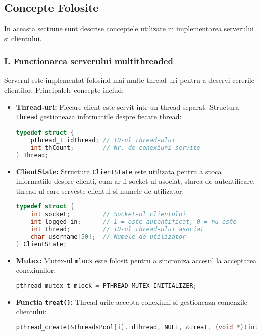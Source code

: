 \documentclass[runningheads]{llncs}
\begin{document}
\subsection{Concepte Folosite}
In aceasta sectiune sunt descrise conceptele utilizate in implementarea serverului si clientului.

\subsubsection*{I. Functionarea serverului multithreaded}
Serverul este implementat folosind mai multe thread-uri pentru a deservi cererile clientilor. Principalele concepte includ:
\begin{itemize}
    \item \textbf{Thread-uri:} Fiecare client este servit intr-un thread separat. Structura \texttt{Thread} gestioneaza informatiile despre fiecare thread:
    \begin{lstlisting}[language=C, basicstyle=\ttfamily\small]
typedef struct {
    pthread_t idThread; // ID-ul thread-ului
    int thCount;        // Nr. de conexiuni servite
} Thread;
    \end{lstlisting}
    
    \item \textbf{ClientState:} Structura \texttt{ClientState} este utilizata pentru a stoca informatiile despre clienti, cum ar fi socket-ul asociat, starea de autentificare, thread-ul care serveste clientul si numele de utilizator:
    \begin{lstlisting}[language=C, basicstyle=\ttfamily\small]
typedef struct {
    int socket;         // Socket-ul clientului
    int logged_in;      // 1 = este autentificat, 0 = nu este
    int thread;         // ID-ul thread-ului asociat
    char username[50];  // Numele de utilizator
} ClientState;
    \end{lstlisting}
    
    \item \textbf{Mutex:} Mutex-ul \texttt{mlock} este folosit pentru a sincroniza accesul la acceptarea conexiunilor:
    \begin{lstlisting}[language=C, basicstyle=\ttfamily\small]
pthread_mutex_t mlock = PTHREAD_MUTEX_INITIALIZER;
    \end{lstlisting}
    
    \item \textbf{Functia \texttt{treat()}:} Thread-urile accepta conexiuni si gestioneaza comenzile clientului:
    \begin{lstlisting}[language=C, basicstyle=\ttfamily\small]
pthread_create(&threadsPool[i].idThread, NULL, &treat, (void *)(intptr_t)i);
    \end{lstlisting}
\end{itemize}
\end{document}
